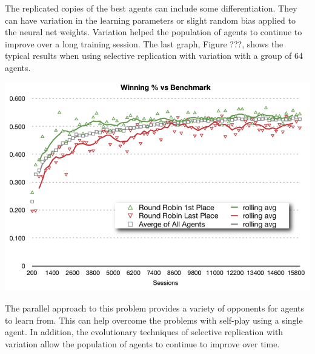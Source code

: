 \documentclass[11pt]{article} %
\begin{document}
\begin{flushleft}

The replicated copies of the best agents can include some differentiation.  They can have variation in the learning parameters or slight random bias applied to the neural net weights.  Variation helped the population of agents to continue to improve over a long training session.  The last graph, Figure ???, shows the typical results when using selective replication with variation with a group of 64 agents.  

\end{flushleft}
\center
\includegraphics[scale=0.8]{fig20}
\begin{flushleft}


The parallel approach to this problem provides a variety of opponents for agents to learn from.  This can help overcome the problems with self-play using a single agent.  In addition, the evolutionary techniques of selective replication with variation allow the population of agents to continue to improve over time.

\end{flushleft}
\end{document}
